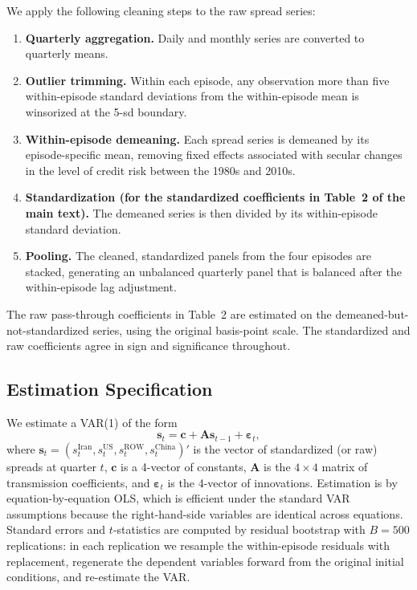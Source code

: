 \documentclass[12pt,a4paper]{article}
\begin{document}
We apply the following cleaning steps to the raw spread series:
\begin{enumerate}[itemsep=2pt, topsep=2pt]
    \item \textbf{Quarterly aggregation.} Daily and monthly series are converted to quarterly means.
    \item \textbf{Outlier trimming.} Within each episode, any observation more than five within-episode standard deviations from the within-episode mean is winsorized at the 5-sd boundary.
    \item \textbf{Within-episode demeaning.} Each spread series is demeaned by its episode-specific mean, removing fixed effects associated with secular changes in the level of credit risk between the 1980s and 2010s.
    \item \textbf{Standardization (for the standardized coefficients in Table~2 of the main text).} The demeaned series is then divided by its within-episode standard deviation.
    \item \textbf{Pooling.} The cleaned, standardized panels from the four episodes are stacked, generating an unbalanced quarterly panel that is balanced after the within-episode lag adjustment.
\end{enumerate}
The raw pass-through coefficients in Table~2 are estimated on the demeaned-but-not-standardized series, using the original basis-point scale. The standardized and raw coefficients agree in sign and significance throughout.

\subsection{Estimation Specification}

We estimate a VAR(1) of the form
\begin{equation}
\mathbf{s}_t = \mathbf{c} + \mathbf{A} \mathbf{s}_{t-1} + \boldsymbol{\varepsilon}_t,
\end{equation}
where $\mathbf{s}_t = (s^{\text{Iran}}_t, s^{\text{US}}_t, s^{\text{ROW}}_t, s^{\text{China}}_t)'$ is the vector of standardized (or raw) spreads at quarter $t$, $\mathbf{c}$ is a 4-vector of constants, $\mathbf{A}$ is the $4 \times 4$ matrix of transmission coefficients, and $\boldsymbol{\varepsilon}_t$ is the 4-vector of innovations. Estimation is by equation-by-equation OLS, which is efficient under the standard VAR assumptions because the right-hand-side variables are identical across equations. Standard errors and $t$-statistics are computed by residual bootstrap with $B = 500$ replications: in each replication we resample the within-episode residuals with replacement, regenerate the dependent variables forward from the original initial conditions, and re-estimate the VAR.
\end{document}
